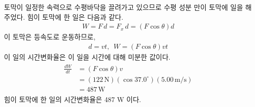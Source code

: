 \documentclass[floatfix,nofootinbib,superscriptaddress,fleqn,preprint]{revtex4}
\begin{document}
 토막이 일정한 속력으로 수평바닥을 끌려가고 있으므로 
 수평 성분 만이 토막에 일을 해주었다. 힘이 토막에 한 일은 다음과 같다.
 \begin{align}
   W = F\,d = F_x\,d = (F\cos{\theta})d
 \end{align}
 이 토막은 등속도로 운동하므로,
 \begin{align}
   d=vt,\,\,\,W=(F\cos{\theta})vt
 \end{align}
 이 일의 시간변화율은 이 일을 시간에 대해 미분한 값이다.
 \begin{align}
   \begin{split}
     \frac{dW}{dt} &= (F\cos{\theta})v  \\
     &= (122\,\mathrm{N})(\cos{37.0^\circ})(5.00\,\mathrm{m/s})  \\
     &= 487\,\mathrm{W}
   \end{split}
 \end{align}
 힘이 토막에 한 일의 시간변화율은 487 W 이다.
\end{document}
